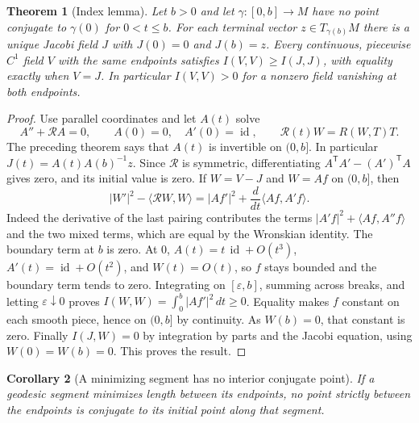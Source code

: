 \documentclass[11pt,oneside,openany]{book}
\theoremstyle{plain}
\newtheorem{theorem}{Theorem}[chapter]
\newtheorem{corollary}[theorem]{Corollary}
\theoremstyle{definition}
\theoremstyle{remark}
\begin{document}
\begin{theorem}[Index lemma]\label{thm:p202-index-lemma}
Let \(b>0\) and let \(\gamma:[0,b]\to M\) have no point conjugate to
\(\gamma(0)\) for \(0<t\le b\). For each terminal vector
\(z\in T_{\gamma(b)}M\) there is a unique Jacobi field \(J\)
with \(J(0)=0\) and \(J(b)=z\). Every continuous, piecewise
\(C^1\) field \(V\) with the same endpoints satisfies
\(I(V,V)\ge I(J,J)\), with equality exactly when \(V=J\).
In particular \(I(V,V)>0\) for a nonzero field vanishing at
both endpoints.
\end{theorem}

\begin{proof}
Use parallel coordinates and let \(A(t)\) solve
\[
 A''+\mathcal R A=0,\qquad A(0)=0,\quad A'(0)=\operatorname{id},
 \qquad \mathcal R(t)W=R(W,T)T.
\]
The preceding theorem says that \(A(t)\) is invertible on
\((0,b]\). In particular \(J(t)=A(t)A(b)^{-1}z\).
Since \(\mathcal R\) is symmetric, differentiating
\(A^{\mathsf T}A'-(A')^{\mathsf T}A\) gives zero, and its
initial value is zero. If \(W=V-J\) and \(W=A f\) on \((0,b]\),
then
\[
 |W'|^2-\langle\mathcal R W,W\rangle
 =|Af'|^2+\frac{d}{dt}\langle Af,A'f\rangle .
\]
Indeed the derivative of the last pairing contributes the
terms \(|A'f|^2+\langle Af,A''f\rangle\) and the two mixed
terms, which are equal by the Wronskian identity. The boundary
term at \(b\) is zero. At \(0\), \(A(t)=t\,\operatorname{id}
+O(t^3)\), \(A'(t)=\operatorname{id}+O(t^2)\), and \(W(t)=O(t)\),
so \(f\) stays bounded and the boundary term tends to zero.
Integrating on \([\varepsilon,b]\), summing across breaks,
and letting \(\varepsilon\downarrow0\) proves
\(I(W,W)=\int_0^b|Af'|^2\,dt\ge0\).
Equality makes \(f\) constant on each smooth piece, hence on
\((0,b]\) by continuity. As \(W(b)=0\), that constant is zero.
Finally \(I(J,W)=0\) by integration by parts and the Jacobi
equation, using \(W(0)=W(b)=0\). This proves the result.
\end{proof}

\begin{corollary}[A minimizing segment has no interior conjugate point]
\label{cor:p202-no-interior-conjugate}
If a geodesic segment minimizes length between its endpoints,
no point strictly between the endpoints is conjugate to its
initial point along that segment.
\end{corollary}
\end{document}
